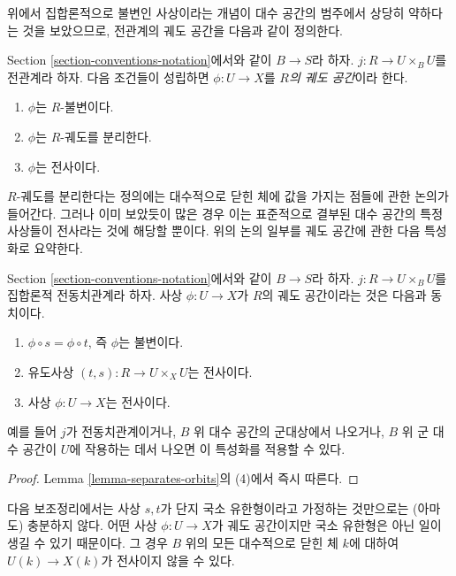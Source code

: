 \noindent
위에서 집합론적으로 불변인 사상이라는 개념이 대수 공간의 범주에서
상당히 약하다는 것을 보았으므로, 전관계의 궤도 공간을 다음과 같이 정의한다.

\begin{definition}
\label{definition-orbit-space}
Section \ref{section-conventions-notation}에서와 같이 $B \to S$라 하자.
$j : R \to U \times_B U$를 전관계라 하자.
다음 조건들이 성립하면 $\phi : U \to X$를 {\it $R$의 궤도 공간}이라 한다.
\begin{enumerate}
\item $\phi$는 $R$-불변이다.
\item $\phi$는 $R$-궤도를 분리한다.
\item $\phi$는 전사이다.
\end{enumerate}
\end{definition}

\noindent
$R$-궤도를 분리한다는 정의에는 대수적으로 닫힌 체에 값을 가지는
점들에 관한 논의가 들어간다. 그러나 이미 보았듯이 많은 경우 이는
표준적으로 결부된 대수 공간의 특정 사상들이 전사라는 것에 해당할 뿐이다.
위의 논의 일부를 궤도 공간에 관한 다음 특성화로 요약한다.

\begin{lemma}
\label{lemma-orbit-space}
Section \ref{section-conventions-notation}에서와 같이 $B \to S$라 하자.
$j : R \to U \times_B U$를 집합론적 전동치관계라 하자.
사상 $\phi : U \to X$가 $R$의 궤도 공간이라는 것은 다음과 동치이다.
\begin{enumerate}
\item $\phi \circ s = \phi \circ t$, 즉 $\phi$는 불변이다.
\item 유도사상 $(t, s) : R \to U \times_X U$는 전사이다.
\item 사상 $\phi : U \to X$는 전사이다.
\end{enumerate}
예를 들어 $j$가 전동치관계이거나, $B$ 위 대수 공간의
군대상에서 나오거나, $B$ 위 군 대수 공간이 $U$에 작용하는 데서
나오면 이 특성화를 적용할 수 있다.
\end{lemma}

\begin{proof}
Lemma \ref{lemma-separates-orbits}의 (4)에서 즉시 따른다.
\end{proof}

\noindent
다음 보조정리에서는 사상 $s, t$가 단지 국소 유한형이라고 가정하는
것만으로는 (아마도) 충분하지 않다. 어떤 사상 $\phi : U \to X$가
궤도 공간이지만 국소 유한형은 아닌 일이 생길 수 있기 때문이다.
그 경우 $B$ 위의 모든 대수적으로 닫힌 체 $k$에 대하여
$U(k) \to X(k)$가 전사이지 않을 수 있다.

